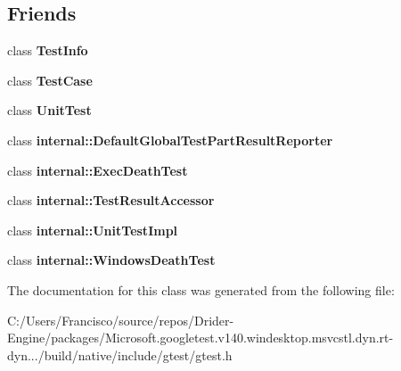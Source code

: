 \subsection*{Friends}
\begin{DoxyCompactItemize}
\item 
\mbox{\label{classtesting_1_1_test_result_a4c49c2cdb6c328e6b709b4542f23de3c}} 
class {\bfseries Test\+Info}
\item 
\mbox{\label{classtesting_1_1_test_result_aff779e55b06adfa7c0088bd10253f0f0}} 
class {\bfseries Test\+Case}
\item 
\mbox{\label{classtesting_1_1_test_result_a832b4d233efee1a32feb0f4190b30d39}} 
class {\bfseries Unit\+Test}
\item 
\mbox{\label{classtesting_1_1_test_result_abae39633da9932847b41cb80efd62115}} 
class {\bfseries internal\+::\+Default\+Global\+Test\+Part\+Result\+Reporter}
\item 
\mbox{\label{classtesting_1_1_test_result_adf5553cae6aea6f8648d47e299237e34}} 
class {\bfseries internal\+::\+Exec\+Death\+Test}
\item 
\mbox{\label{classtesting_1_1_test_result_ae762da04e74a0d3b0daded3c5bd4a8e8}} 
class {\bfseries internal\+::\+Test\+Result\+Accessor}
\item 
\mbox{\label{classtesting_1_1_test_result_acc0a5e7573fd6ae7ad1878613bb86853}} 
class {\bfseries internal\+::\+Unit\+Test\+Impl}
\item 
\mbox{\label{classtesting_1_1_test_result_a6aeedc04a0590fcc1b3c5f687dbb0f9f}} 
class {\bfseries internal\+::\+Windows\+Death\+Test}
\end{DoxyCompactItemize}


The documentation for this class was generated from the following file\+:\begin{DoxyCompactItemize}
\item 
C\+:/\+Users/\+Francisco/source/repos/\+Drider-\/\+Engine/packages/\+Microsoft.\+googletest.\+v140.\+windesktop.\+msvcstl.\+dyn.\+rt-\/dyn.../build/native/include/gtest/gtest.\+h\end{DoxyCompactItemize}
